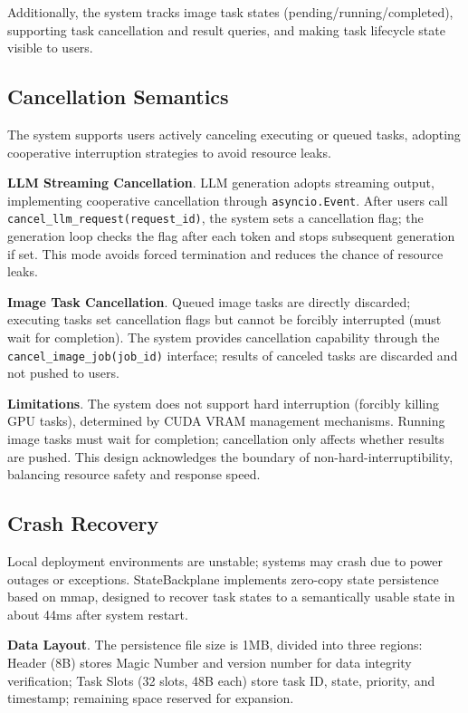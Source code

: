 Additionally, the system tracks image task states (pending/running/completed), supporting task cancellation and result queries, and making task lifecycle state visible to users.

\subsection{Cancellation Semantics}

The system supports users actively canceling executing or queued tasks, adopting cooperative interruption strategies to avoid resource leaks.

\textbf{LLM Streaming Cancellation}. LLM generation adopts streaming output, implementing cooperative cancellation through \texttt{asyncio.Event}. After users call \texttt{cancel\_llm\_request(request\_id)}, the system sets a cancellation flag; the generation loop checks the flag after each token and stops subsequent generation if set. This mode avoids forced termination and reduces the chance of resource leaks.

\textbf{Image Task Cancellation}. Queued image tasks are directly discarded; executing tasks set cancellation flags but cannot be forcibly interrupted (must wait for completion). The system provides cancellation capability through the \texttt{cancel\_image\_job(job\_id)} interface; results of canceled tasks are discarded and not pushed to users.

\textbf{Limitations}. The system does not support hard interruption (forcibly killing GPU tasks), determined by CUDA VRAM management mechanisms. Running image tasks must wait for completion; cancellation only affects whether results are pushed. This design acknowledges the boundary of non-hard-interruptibility, balancing resource safety and response speed.

\subsection{Crash Recovery}

Local deployment environments are unstable; systems may crash due to power outages or exceptions. StateBackplane implements zero-copy state persistence based on mmap, designed to recover task states to a semantically usable state in about 44ms after system restart.

\textbf{Data Layout}. The persistence file size is 1MB, divided into three regions: Header (8B) stores Magic Number and version number for data integrity verification; Task Slots (32 slots, 48B each) store task ID, state, priority, and timestamp; remaining space reserved for expansion.

